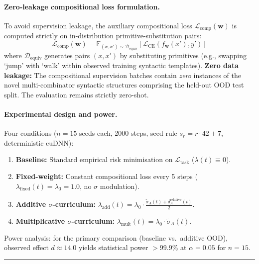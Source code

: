 \documentclass{article}
\theoremstyle{definition}
\begin{document}
\paragraph*{Zero-leakage compositional loss formulation.}
To avoid supervision leakage, the auxiliary compositional loss $\mathcal{L}_{\text{comp}}(\mathbf{w})$ is computed strictly on in-distribution primitive-substitution pairs:
\begin{equation}\label{eq:comp-loss-def}
\mathcal{L}_{\text{comp}}(\mathbf{w}) = \mathbb{E}_{(x, x') \sim \mathcal{D}_{\text{equiv}}} \left[ \mathcal{L}_{\text{CE}}(f_{\mathbf{w}}(x'), y') \right]
\end{equation}
where $\mathcal{D}_{\text{equiv}}$ generates pairs $(x, x')$ by substituting primitives (e.g., swapping `jump' with `walk' within observed training syntactic templates). \textbf{Zero data leakage:} The compositional supervision batches contain \emph{zero} instances of the novel multi-combinator syntactic structures comprising the held-out OOD test split. The evaluation remains strictly zero-shot.

\paragraph*{Experimental design and power.}
Four conditions ($n = 15$ seeds each, 2000 steps, seed rule $s_r = r \cdot 42 + 7$, deterministic cuDNN):
\begin{enumerate}[nosep]
\item \textbf{Baseline:} Standard empirical risk minimisation on $\mathcal{L}_{\text{task}}$ ($\lambda(t) \equiv 0$).
\item \textbf{Fixed-weight:} Constant compositional loss every 5 steps ($\lambda_{\text{fixed}}(t) = \lambda_0 = 1.0$, no $\sigma$ modulation).
\item \textbf{Additive $\sigma$-curriculum:} $\lambda_{\text{add}}(t) = \lambda_0 \cdot \frac{\tilde{\sigma}_A(t) + \delta_A^{\text{relative}}(t)}{2}$.
\item \textbf{Multiplicative $\sigma$-curriculum:} $\lambda_{\text{mult}}(t) = \lambda_0 \cdot \tilde{\sigma}_A(t)$.
\end{enumerate}
Power analysis: for the primary comparison (baseline vs.\ additive OOD), observed effect $d \approx 14.0$ yields statistical power $> 99.9\%$ at $\alpha = 0.05$ for $n = 15$.

\noindent\rule{\linewidth}{0.4pt}

\end{document}

